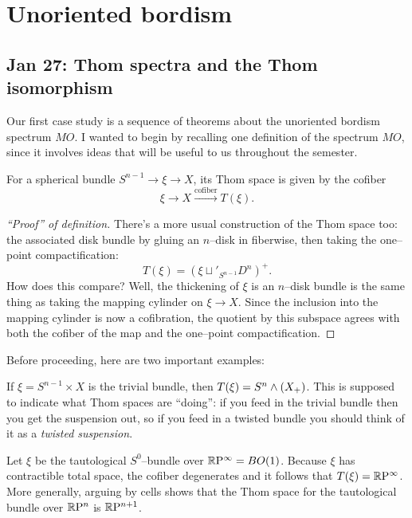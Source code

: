 
\chapter{Unoriented bordism}\label{UnorientedBordismChapter}




\section{Jan 27: Thom spectra and the Thom isomorphism}\label{LectureThomSpectra}

Our first case study is a sequence of theorems about the unoriented bordism spectrum $MO$.  I wanted to begin by recalling one definition of the spectrum $MO$, since it involves ideas that will be useful to us throughout the semester.

\begin{definition}
For a spherical bundle $S^{n-1} \to \xi \to X$, its Thom space is given by the cofiber \[\xi \to X \xrightarrow{\text{cofiber}} T(\xi).\]
\end{definition}
\begin{proof}[``Proof'' of definition]
There's a more usual construction of the Thom space too: the associated disk bundle by gluing an $n$--disk in fiberwise, then taking the one--point compactification: \[T(\xi) = (\xi \sqcup'_{S^{n-1}} D^n)^+.\] How does this compare? Well, the thickening of $\xi$ is an $n$--disk bundle is the same thing as taking the mapping cylinder on $\xi \to X$. Since the inclusion into the mapping cylinder is now a cofibration, the quotient by this subspace agrees with both the cofiber of the map and the one--point compactification.
\end{proof}

Before proceeding, here are two important examples:
\begin{example}\label{TrivialBundleThomExample}
If $\xi = S^{n-1} \times X$ is the trivial bundle, then $T(\xi) = S^n \wedge (X_+)$.  This is supposed to indicate what Thom spaces are ``doing'': if you feed in the trivial bundle then you get the suspension out, so if you feed in a twisted bundle you should think of it as a \textit{twisted suspension}.
\end{example}

\begin{example}\label{RPnThomExample}
Let $\xi$ be the tautological $S^0$--bundle over $\mathbb R\mathrm P^\infty = BO(1)$.  Because $\xi$ has contractible total space, the cofiber degenerates and it follows that $T(\xi) = \mathbb R\mathrm P^\infty$. More generally, arguing by cells shows that the Thom space for the tautological bundle over $\mathbb R\mathrm P^n$ is $\mathbb R\mathrm P^{n+1}$.
\end{example}

